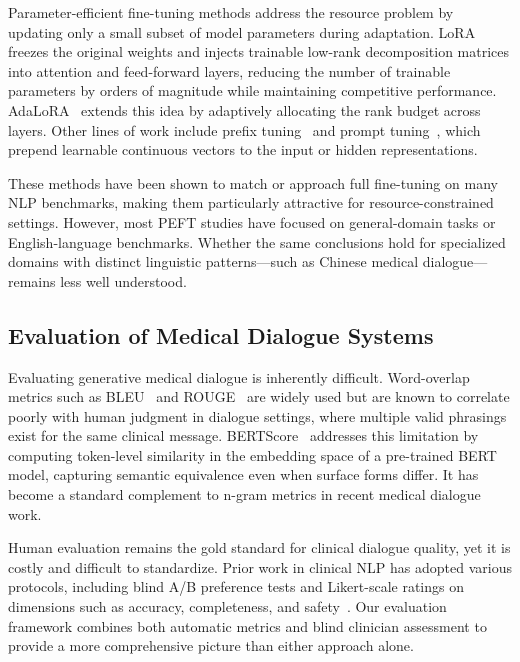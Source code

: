 \documentclass[11pt,a4paper]{article}
\begin{document}
Parameter-efficient fine-tuning methods address the resource problem by updating only a small subset of model parameters during adaptation. LoRA~\cite{hu2021lora} freezes the original weights and injects trainable low-rank decomposition matrices into attention and feed-forward layers, reducing the number of trainable parameters by orders of magnitude while maintaining competitive performance. AdaLoRA~\cite{zhang2023adalora} extends this idea by adaptively allocating the rank budget across layers. Other lines of work include prefix tuning~\cite{li2021prefix} and prompt tuning~\cite{lester2021prompt}, which prepend learnable continuous vectors to the input or hidden representations.

These methods have been shown to match or approach full fine-tuning on many NLP benchmarks, making them particularly attractive for resource-constrained settings. However, most PEFT studies have focused on general-domain tasks or English-language benchmarks. Whether the same conclusions hold for specialized domains with distinct linguistic patterns---such as Chinese medical dialogue---remains less well understood.

\subsection{Evaluation of Medical Dialogue Systems}

Evaluating generative medical dialogue is inherently difficult. Word-overlap metrics such as BLEU~\cite{papineni2002bleu} and ROUGE~\cite{lin2004rouge} are widely used but are known to correlate poorly with human judgment in dialogue settings, where multiple valid phrasings exist for the same clinical message. BERTScore~\cite{zhang2019bertscore} addresses this limitation by computing token-level similarity in the embedding space of a pre-trained BERT model, capturing semantic equivalence even when surface forms differ. It has become a standard complement to n-gram metrics in recent medical dialogue work.

Human evaluation remains the gold standard for clinical dialogue quality, yet it is costly and difficult to standardize. Prior work in clinical NLP has adopted various protocols, including blind A/B preference tests and Likert-scale ratings on dimensions such as accuracy, completeness, and safety~\cite{lee2023evaluating}. Our evaluation framework combines both automatic metrics and blind clinician assessment to provide a more comprehensive picture than either approach alone.
\end{document}
